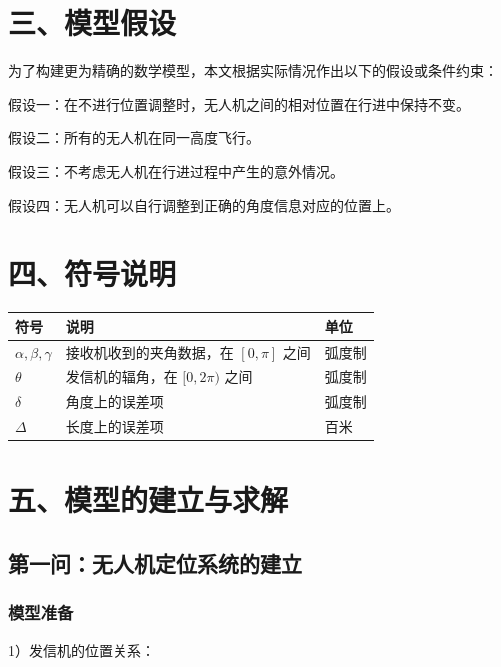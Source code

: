 \documentclass{my_paper}
\begin{document}
\section{三、模型假设}

为了构建更为精确的数学模型，本文根据实际情况作出以下的假设或条件约束：

假设一：在不进行位置调整时，无人机之间的相对位置在行进中保持不变。

假设二：所有的无人机在同一高度飞行。

假设三：不考虑无人机在行进过程中产生的意外情况。

假设四：无人机可以自行调整到正确的角度信息对应的位置上。

\newpage

\section{四、符号说明}
\begin{table}[h]%
    \centering
    \begin{tabular}{p{2.0cm}<{\centering}p{9.0cm}<{\centering}p{2.0cm}<{\centering}}
    \hline
    符号 & 说明 & 单位 \\ %
    \hline
    $\alpha,\beta,\gamma$ & 接收机收到的夹角数据，在 $[0,\pi]$ 之间 & 弧度制 \\ %
    $\theta$ & 发信机的辐角，在 $[0,2\pi)$ 之间 &  弧度制 \\ %
    $\delta$ & 角度上的误差项 & 弧度制 \\
    $\Delta$ & 长度上的误差项 & 百米 \\ %
    \hline
    \end{tabular}
\end{table}


\newpage

\section{五、模型的建立与求解}

\subsection{第一问：无人机定位系统的建立}
\subsubsection{模型准备}
1）发信机的位置关系：
\end{document}
